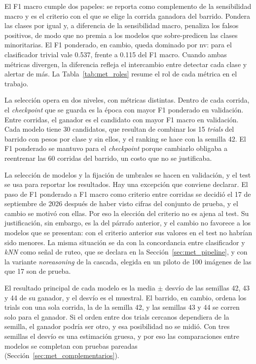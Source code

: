 El F1 macro cumple dos papeles: se reporta como complemento de la sensibilidad macro y es el criterio con el que se
elige la corrida ganadora del barrido. Pondera las clases por igual y, a diferencia de la sensibilidad macro,
penaliza los falsos positivos, de modo que no premia a los modelos que sobre-predicen las clases minoritarias. El F1
ponderado, en cambio, queda dominado por \gls{nv}: para el clasificador trivial vale 0.537, frente a 0.115 del F1
macro. Cuando ambas métricas divergen, la diferencia refleja el intercambio entre detectar cada clase y alertar de
más. La Tabla~\ref{tab:met_roles} resume el rol de cada métrica en el trabajo.

La selección opera en dos niveles, con métricas distintas. Dentro de cada corrida, el \emph{checkpoint} que se
guarda es la época con mayor F1 ponderado en validación. Entre corridas, el ganador es el candidato con mayor F1
macro en validación. Cada modelo tiene 30 candidatos, que resultan de combinar los 15 \emph{trials} del barrido con
pesos por clase y sin ellos, y el ranking se hace con la semilla 42. El F1 ponderado se mantuvo para el
\emph{checkpoint} porque cambiarlo obligaba a reentrenar las 60 corridas del barrido, un costo que no se justificaba.

La selección de modelos y la fijación de umbrales se hacen en validación, y el test se usa para reportar los
resultados. Hay una excepción que conviene declarar. El paso de F1 ponderado a F1 macro como criterio entre corridas
se decidió el 17 de septiembre de 2026 después de haber visto cifras del conjunto de prueba, y el cambio se motivó
con ellas. Por eso la elección del criterio no es ajena al test. Su justificación, sin embargo, es la del párrafo
anterior, y el cambio no favorece a los modelos que se presentan: con el criterio anterior sus valores en el test no
habrían sido menores. La misma situación se da con la concordancia entre clasificador y \emph{kNN} como señal de ruteo, que se
declara en la Sección~\ref{sec:met_pipeline}, y con la variante \emph{noreasoning} de la cascada, elegida en un
piloto de 100 imágenes de las que 17 son de prueba.

El resultado principal de cada modelo es la media $\pm$ desvío de las semillas 42, 43 y 44 de su ganador, y el
desvío es el muestral. El barrido, en cambio, ordena los trials con una sola corrida, la de la semilla 42, y las
semillas 43 y 44 se corren solo para el ganador. Si el orden entre dos trials cercanos dependiera de la semilla, el
ganador podría ser otro, y esa posibilidad no se midió. Con tres semillas el desvío es una estimación gruesa, y por
eso las comparaciones entre modelos se completan con pruebas pareadas (Sección~\ref{sec:met_complementarios}).

